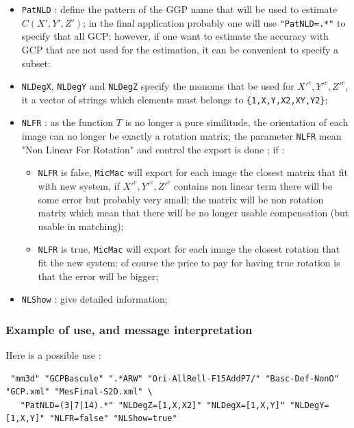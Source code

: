 \begin{itemize}
  \item  {\tt PatNLD} :  define the pattern of the GGP name that will be used to estimate  $C(X',Y',Z')$;
         in the final application probably one will use {\tt "PatNLD=.*"} to specify that all GCP; however,
         if one want to estimate the accuracy with GCP that are not used for the estimation, it can be
         convenient to specify a subset:
   \item  {\tt NLDegX}, {\tt NLDegY} and  {\tt NLDegZ} specify the monoms that be used for  $X'^c,Y'^c,Z'^c$,
          it a vector of strings  which elements must belongs to {\tt \{1,X,Y,X2,XY,Y2\}};
   \item  {\tt NLFR}  : as the function $T$ is no longer a pure similitude, the orientation of each image
          can no longer be exactly a rotation matrix; the parameter {\tt NLFR} mean "Non Linear For Rotation" and
          control the export is done ; if :

\begin{itemize}
     \item   {\tt NLFR} is false, {\tt MicMac} will export for each image the closest matrix that fit
             with new system, if $X'^c,Y'^c,Z'^c$ contains non linear term there will be some error but
             probably very small; the matrix will be non rotation matrix which mean that there will be
             no longer usable compensation (but usable in matching);

     \item   {\tt NLFR} is true, {\tt MicMac} will export for each image the closest rotation that fit
             the new system; of course the price to pay for having true rotation is that the error will be bigger;

\end{itemize}

   \item  {\tt NLShow}  : give detailed information;
\end{itemize}




\subsubsection{Example of use, and message interpretation}

Here is a possible use :

{\small
\begin{verbatim}
 "mm3d" "GCPBascule" ".*ARW" "Ori-AllRell-F15AddP7/" "Basc-Def-NonO" "GCP.xml" "MesFinal-S2D.xml" \
   "PatNLD=(3|7|14).*" "NLDegZ=[1,X,X2]" "NLDegX=[1,X,Y]" "NLDegY=[1,X,Y]" "NLFR=false" "NLShow=true"
\end{verbatim}
}

